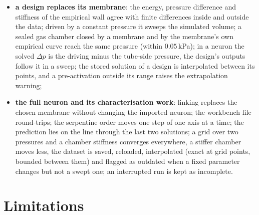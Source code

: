 \documentclass[11pt,a4paper]{article}
\theoremstyle{remark}
\begin{document}
\begin{itemize}
      orifice's flow matches its law by hand; on a generated round-tube valve the flow connections are
      found without false openings, the pressure falls along the tube, squeezing reduces the mass
      flow, and the design file round-trips;
\item \textbf{a design replaces its membrane}: the energy, pressure difference and stiffness of the
      empirical wall agree with finite differences inside and outside the data; driven by a constant
      pressure it sweeps the simulated volume; a sealed gas chamber closed by a membrane and by the
      membrane's own empirical curve reach the same pressure (within $0.05$\,kPa); in a neuron the
      solved $\Delta p$ is the driving minus the tube-side pressure, the design's outputs follow it in
      a sweep; the stored solution of a
      design is interpolated between its points, and a pre-activation outside its range raises the
      extrapolation warning;
\item \textbf{the full neuron and its characterisation work}: linking replaces the chosen membrane
      without changing the imported neuron; the workbench file round-trips; the serpentine order
      moves one step of one axis at a time; the prediction lies on the line through the last two
      solutions; a grid over two pressures and a chamber stiffness converges everywhere, a stiffer
      chamber moves less, the dataset is saved, reloaded, interpolated (exact at grid points, bounded
      between them) and flagged as outdated when a fixed parameter changes but not a swept one; an
      interrupted run is kept as incomplete.
\end{itemize}

\section{Limitations}\label{sec:limitations}
\end{document}
